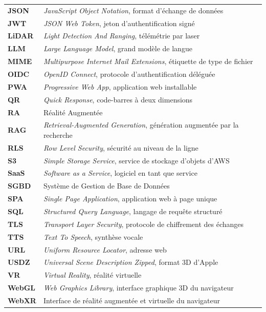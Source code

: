 \begin{longtable}{@{}L{2.6cm}@{\hspace{0.6em}}L{11.6cm}@{}}
\textbf{JSON}     & \emph{JavaScript Object Notation}, format d'échange de données \\
\textbf{JWT}      & \emph{JSON Web Token}, jeton d'authentification signé \\
\textbf{LiDAR}    & \emph{Light Detection And Ranging}, télémétrie par laser \\
\textbf{LLM}      & \emph{Large Language Model}, grand modèle de langue \\
\textbf{MIME}     & \emph{Multipurpose Internet Mail Extensions}, étiquette de type de fichier \\
\textbf{OIDC}     & \emph{OpenID Connect}, protocole d'authentification déléguée \\
\textbf{PWA}      & \emph{Progressive Web App}, application web installable \\
\textbf{QR}       & \emph{Quick Response}, code-barres à deux dimensions \\
\textbf{RA}       & Réalité Augmentée \\
\textbf{RAG}      & \emph{Retrieval-Augmented Generation}, génération augmentée par la recherche \\
\textbf{RLS}      & \emph{Row Level Security}, sécurité au niveau de la ligne \\
\textbf{S3}       & \emph{Simple Storage Service}, service de stockage d'objets d'AWS \\
\textbf{SaaS}     & \emph{Software as a Service}, logiciel en tant que service \\
\textbf{SGBD}     & Système de Gestion de Base de Données \\
\textbf{SPA}      & \emph{Single Page Application}, application web à page unique \\
\textbf{SQL}      & \emph{Structured Query Language}, langage de requête structuré \\
\textbf{TLS}      & \emph{Transport Layer Security}, protocole de chiffrement des échanges \\
\textbf{TTS}      & \emph{Text To Speech}, synthèse vocale \\
\textbf{URL}      & \emph{Uniform Resource Locator}, adresse web \\
\textbf{USDZ}     & \emph{Universal Scene Description Zipped}, format 3D d'Apple \\
\textbf{VR}       & \emph{Virtual Reality}, réalité virtuelle \\
\textbf{WebGL}    & \emph{Web Graphics Library}, interface graphique 3D du navigateur \\
\textbf{WebXR}    & Interface de réalité augmentée et virtuelle du navigateur \\
\end{longtable}
\endgroup


